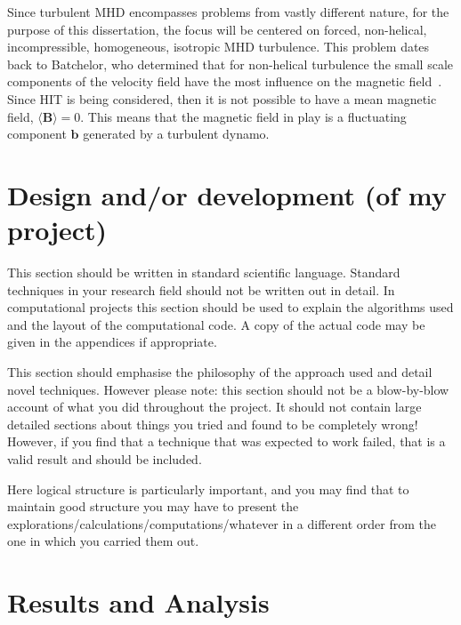 \documentclass[12pt,a4paper]{report}
\begin{document}
Since turbulent MHD encompasses problems from vastly different nature, for the purpose of this dissertation, the focus will be centered on forced, non-helical, incompressible, homogeneous, isotropic MHD turbulence. This problem dates back to Batchelor, who determined that for non-helical turbulence the small scale components of the velocity field have the most influence on the magnetic field~\cite{batchelor1950spontaneous}. Since HIT is being considered, then it is not possible to have a mean magnetic field, $\langle \bm B \rangle = 0$. This means that the magnetic field in play is a fluctuating component $\bm b$ generated by a turbulent dynamo. 





















\chapter{Design and/or development (of my project)}

This section should be written in standard scientific
language. Standard techniques in your research field should not be
written out in detail. In computational projects this section should
be used to explain the algorithms used and the layout of the
computational code. A copy of the actual code may be given in the
appendices if appropriate.

This section should emphasise the philosophy of the approach used and
detail novel techniques. However please note: this section should not
be a blow-by-blow account of what you did throughout the project. It
should not contain large detailed sections about things you tried and
found to be completely wrong! However, if you find that a technique
that was expected to work failed, that is a valid result and should be
included.

Here logical structure is particularly important, and you may find
that to maintain good structure you may have to present the
explorations/calculations/computations/whatever in a different order
from the one in which you carried them out.


\chapter{Results and Analysis}
\end{document}
